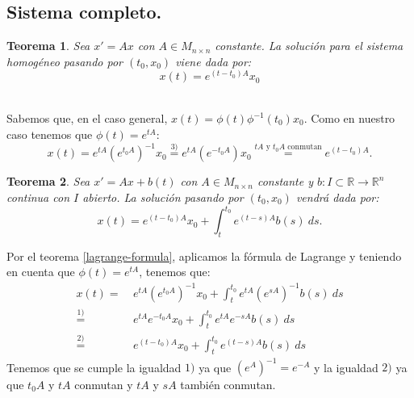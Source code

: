\documentclass[11pt]{article}
\makeatletter
\theoremstyle{theorem-style}  %
\newtheorem{theorem}{Teorema}[section]  %
\renewenvironment{proof}[1][\proofname]{\par
	\pushQED{\qed}%
	\normalfont \topsep6\p@\@plus6\p@\relax
	\list{}{%
		\settowidth{\leftmargin}{\quad:\hskip\labelsep}%
		\setlength{\labelwidth}{0pt}%
		\setlength{\itemindent}{-\leftmargin}%
	}%
	\item[\hskip\labelsep\itshape#1\@addpunct{:}]\ignorespaces
}{%
	\popQED\endlist\@endpefalse
}
\theoremstyle{definition-style}
\theoremstyle{example-style}
\makeatother
\begin{document}
\subsection{Sistema completo.}
\begin{theorem}
	Sea $x' = Ax$ con $A \in M_{n \times n}$ constante. La solución para el sistema homogéneo pasando por $(t_0, x_0)$ viene dada por:
	\[x(t) = e^{(t - t_0)A}x_0\]
\end{theorem}
\begin{proof}\ \\
	Sabemos que, en el caso general, $x(t) = \phi (t) \phi^{-1} (t_0) x_0$. Como en nuestro caso tenemos que $\phi (t) = e^{tA}$:
	\[x(t) = e^{tA}(e^{t_0A})^{-1}x_0 \stackrel{3)}{=} e^{tA}(e^{-t_0A})x_0 \stackrel{tA \text{ y } t_0A \text{ conmutan}}{=} e^{(t - t_0)A}.\]
\end{proof}
\begin{theorem}
	Sea $x' = Ax + b(t)$ con $A \in M_{n \times n}$ constante y $ b:I \subset \mathbb{R} \longrightarrow \mathbb{R}^n $	continua con $I$ abierto. La solución pasando por $(t_0, x_0)$ vendrá dada por:
	\[x(t) = e^{(t - t_0)A}x_0 + \int_{t}^{t_0}e^{(t - s)A}b(s) \ ds.\]
\end{theorem}
\begin{proof}
	Por el teorema \ref{lagrange-formula}, aplicamos la fórmula de Lagrange y teniendo en cuenta que $\phi (t) = e^{tA}$, tenemos que:
	\begin{align*}
	x(t) =& \ e^{tA}(e^{t_0A})^{-1}x_0 + \int_{t}^{t_0} e^{tA}(e^{sA})^{-1} b(s) \ ds  \\
	\stackrel{1)}{=}& \ e^{tA}e^{-t_0A}x_0 + \int_{t}^{t_0}e^{tA}e^{-sA} b(s) \ ds \\
	\stackrel{2)}{=}& \ e^{(t-t_0)A}x_0 + \int_{t}^{t_0}e^{(t-s)A} b(s) \ ds
	\end{align*}
	Tenemos que se cumple la igualdad $1)$ ya que $(e^A)^{-1} = e^{-A}$ y la igualdad $2)$ ya que $t_0A$ y $tA$ conmutan y $tA$ y $sA$ también conmutan.
\end{proof}
\end{document}
